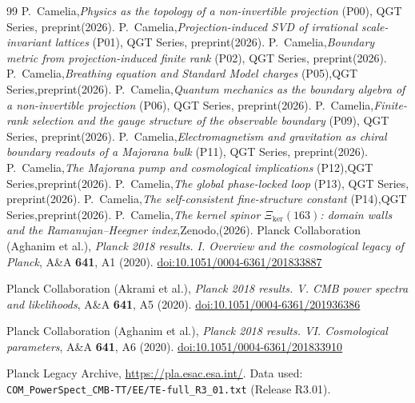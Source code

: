 \documentclass[twocolumn,10pt]{article}
\begin{document}
\begin{thebibliography}{99}
P.~Camelia,\textit{Physics as the topology of a non-invertible projection} (P00), QGT Series, preprint(2026).
P.~Camelia,\textit{Projection-induced SVD of irrational scale-invariant lattices} (P01), QGT Series, preprint(2026).
P.~Camelia,\textit{Boundary metric from projection-induced finite rank} (P02), QGT Series, preprint(2026).
P.~Camelia,\textit{Breathing equation and Standard Model charges} (P05),QGT Series,preprint(2026).
P.~Camelia,\textit{Quantum mechanics as the boundary algebra of a non-invertible projection} (P06), QGT Series, preprint(2026).
P.~Camelia,\textit{Finite-rank selection and the gauge structure of the observable boundary} (P09), QGT Series, preprint(2026).
P.~Camelia,\textit{Electromagnetism and gravitation as chiral boundary readouts of a Majorana bulk} (P11), QGT Series, preprint(2026).
P.~Camelia,\textit{The Majorana pump and cosmological implications} (P12),QGT Series,preprint(2026).
P.~Camelia,\textit{The global phase-locked loop} (P13), QGT Series, preprint(2026).
P.~Camelia,\textit{The self-consistent fine-structure constant} (P14),QGT Series,preprint(2026).
P.~Camelia,\textit{The kernel spinor $\Xi_{\ker}(163)$: domain walls and the Ramanujan--Heegner index},Zenodo,(2026).
Planck Collaboration (Aghanim et al.),
  \textit{Planck 2018 results. I. Overview and the cosmological legacy of Planck},
  A\&A \textbf{641}, A1 (2020).
  \href{https://doi.org/10.1051/0004-6361/201833887}{doi:10.1051/0004-6361/201833887}

Planck Collaboration (Akrami et al.),
  \textit{Planck 2018 results. V. CMB power spectra and likelihoods},
  A\&A \textbf{641}, A5 (2020).
  \href{https://doi.org/10.1051/0004-6361/201936386}{doi:10.1051/0004-6361/201936386}

Planck Collaboration (Aghanim et al.),
  \textit{Planck 2018 results. VI. Cosmological parameters},
  A\&A \textbf{641}, A6 (2020).
  \href{https://doi.org/10.1051/0004-6361/201833910}{doi:10.1051/0004-6361/201833910}

Planck Legacy Archive,
  \href{https://pla.esac.esa.int/}{https://pla.esac.esa.int/}.
  Data used: \texttt{COM\_PowerSpect\_CMB-TT/EE/TE-full\_R3\_01.txt}
  (Release R3.01).


\end{thebibliography}
\end{document}
